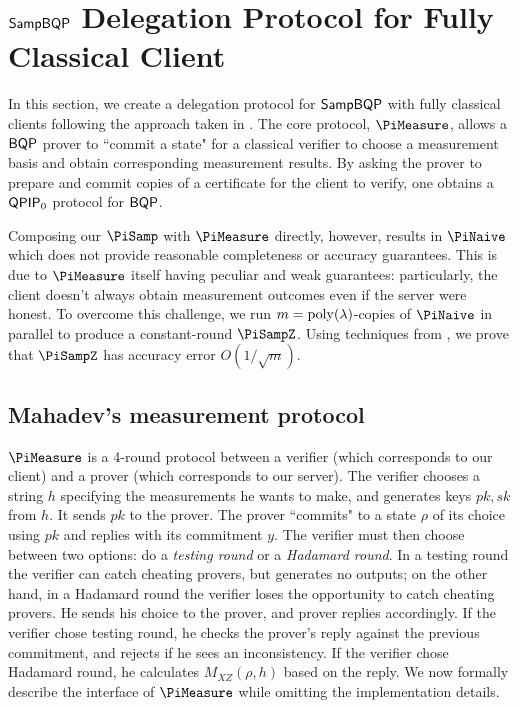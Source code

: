 \section{$\operatorname{\mathsf{SampBQP}}$ Delegation Protocol for Fully Classical Client}
\label{sec:qpip0_all}


In this section, we create a delegation protocol for $\operatorname{\mathsf{SampBQP}}$ with fully classical clients following the approach taken in \cite{FOCS:Mahadev18a}.
The core protocol, $\PiMeasure$, allows a $\operatorname{\mathsf{BQP}}$ prover to ``commit a state" for a classical verifier to choose a measurement basis and obtain corresponding measurement results.
By asking the prover to prepare and commit copies of a certificate for the client to verify, one obtains a $\operatorname{\mathsf{QPIP}}_0$ protocol for $\operatorname{\mathsf{BQP}}$.

Composing our $\PiSamp$ with $\PiMeasure$ directly, however, results in $\PiNaive$ which does not provide reasonable completeness or accuracy guarantees.
This is due to $\PiMeasure$ itself having peculiar and weak guarantees:
particularly, the client doesn't always obtain measurement outcomes even if the server were honest.
To overcome this challenge, we run $m=\operatorname*{\operatorname{poly}}(\lambda)$-copies of $\PiNaive$ in parallel to produce a constant-round $\PiSampZ$.
Using techniques from \cite{arXiv:ChiaChungYam19}, we prove that $\PiSampZ$ has accuracy error $O(1/\sqrt{m})$.

\subsection{Mahadev's measurement protocol}\label{sec:urmila4}

$\PiMeasure$ is a 4-round protocol between a verifier (which corresponds to our client) and a prover (which corresponds to our server).
The verifier chooses a string $h$ specifying the measurements he wants to make, and generates keys $pk, sk$ from $h$. It sends $pk$ to the prover. The prover ``commits" to a state $\rho$ of its choice using $pk$ and replies with its commitment $y$.
The verifier must then choose between two options: do a \emph{testing round} or a \emph{Hadamard round}.
In a testing round the verifier can catch cheating provers, but generates no outputs;
on the other hand, in a Hadamard round the verifier loses the opportunity to catch cheating provers.
He sends his choice to the prover, and prover replies accordingly. If the verifier chose testing round, he checks the prover's reply against the previous commitment, and rejects if he sees an inconsistency. If the verifier chose Hadamard round, he calculates $M_{XZ}(\rho, h)$ based on the reply.
We now formally describe the interface of $\PiMeasure$ while omitting the implementation details.

